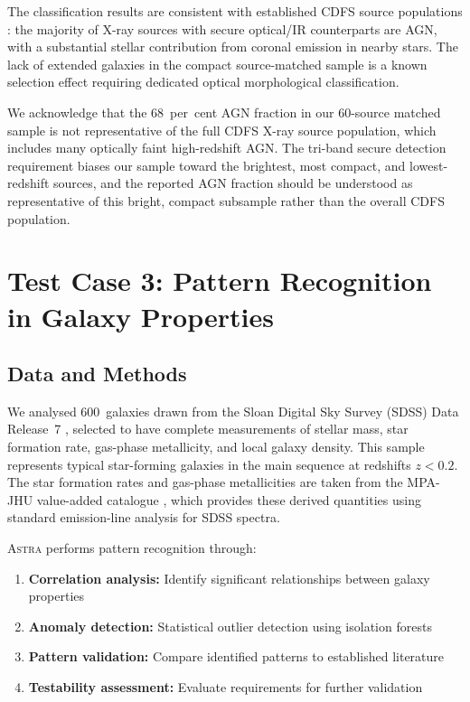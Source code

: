 \documentclass[fleqn,usenatbib]{mnras}
\newcommand{\astra}{\textsc{Astra}\xspace}
\begin{document}
The classification results are consistent with established CDFS source populations \citep{Alexander2003,Bauer2004}: the majority of X-ray sources with secure optical/IR counterparts are AGN, with a substantial stellar contribution from coronal emission in nearby stars.
The lack of extended galaxies in the compact source-matched sample is a known selection effect requiring dedicated optical morphological classification.

We acknowledge that the 68~per~cent AGN fraction in our 60-source matched sample is not representative of the full CDFS X-ray source population, which includes many optically faint high-redshift AGN.
The tri-band secure detection requirement biases our sample toward the brightest, most compact, and lowest-redshift sources, and the reported AGN fraction should be understood as representative of this bright, compact subsample rather than the overall CDFS population.

\section{Test Case 3: Pattern Recognition in Galaxy Properties}
\label{sec:tc3}

\subsection{Data and Methods}
\label{sec:tc3:data}

We analysed 600~galaxies drawn from the Sloan Digital Sky Survey (SDSS) Data Release~7 \citep{Abazajian2009}, selected to have complete measurements of stellar mass, star formation rate, gas-phase metallicity, and local galaxy density.
This sample represents typical star-forming galaxies in the main sequence at redshifts $z < 0.2$.
The star formation rates and gas-phase metallicities are taken from the MPA-JHU value-added catalogue \citep{Brinchmann2004}, which provides these derived quantities using standard emission-line analysis for SDSS spectra.

\astra performs pattern recognition through:
\begin{enumerate}
  \item[(i)] \textbf{Correlation analysis:} Identify significant relationships between galaxy properties
  \item[(ii)] \textbf{Anomaly detection:} Statistical outlier detection using isolation forests
  \item[(iii)] \textbf{Pattern validation:} Compare identified patterns to established literature
  \item[(iv)] \textbf{Testability assessment:} Evaluate requirements for further validation
\end{enumerate}
\end{document}
